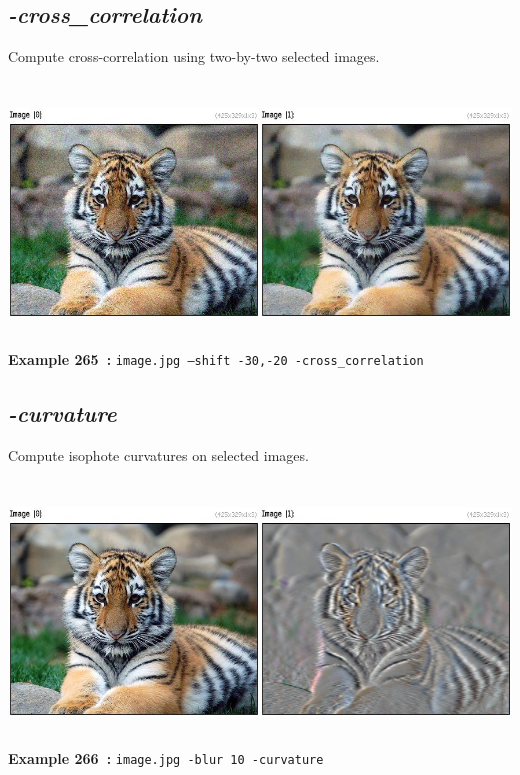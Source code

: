 \documentclass[a4paper,11pt,twoside]{book}
\begin{document}
\subsection{\emph{-cross\_correlation} }\vspace*{-0.5em}
Compute cross-correlation using two-by-two selected images.
\begin{center}\includegraphics[keepaspectratio=true,height=7cm,width=\textwidth]{img/gmic_def265.jpg}\\
{\footnotesize \textbf{Example 265~:} \texttt{image.jpg --shift -30,-20 -cross\_correlation}}
\end{center}

\subsection{\emph{-curvature} }\vspace*{-0.5em}
Compute isophote curvatures on selected images.
\begin{center}\includegraphics[keepaspectratio=true,height=7cm,width=\textwidth]{img/gmic_def266.jpg}\\
{\footnotesize \textbf{Example 266~:} \texttt{image.jpg -blur 10 -curvature}}
\end{center}
\end{document}
